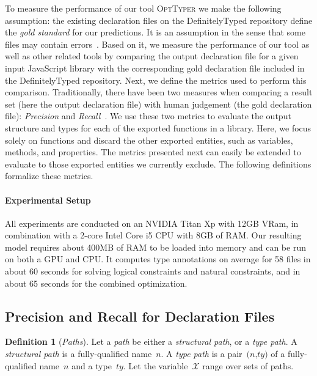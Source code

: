 \documentclass[sigplan,10pt,review,anonymous]{acmart} %
\newcommand{\projectname}{\textsc{OptTyper}\xspace}
\theoremstyle{plain}
\theoremstyle{remark}
\theoremstyle{definition}
\newtheorem{defn}{Definition}[section]
\begin{document}
To measure the performance of our tool \projectname we make the following assumption:
the existing declaration files on the DefinitelyTyped repository define the \textit{gold standard}
for our predictions.
It is an assumption in the sense that some files may contain errors~\citep{williams17}.
Based on it, we measure the performance of our tool as well as other related tools
by comparing the output declaration file for a given input JavaScript library
with the corresponding gold declaration file included in the DefinitelyTyped repository.
Next, we define the metrics used to perform this comparison.
Traditionally, there have been two measures when comparing a result set
(here the output declaration file) with human judgement (the gold declaration file):
\textit{Precision} and \textit{Recall}~\citep{russel16}.
We use these two metrics to evaluate the output structure and types for each of the exported functions in a library.
Here, we focus solely on functions and discard the other exported entities,
such as variables, methods, and properties.
The metrics presented next can easily be extended to evaluate to those exported
entities we currently exclude.
The following definitions formalize these metrics.

\paragraph{Experimental Setup}

All experiments are conducted on an NVIDIA Titan Xp with 12GB VRam,
in combination with a 2-core Intel Core i5 CPU with 8GB of RAM.
Our resulting model requires about 400MB of RAM to be loaded into memory and can be run on both a GPU and CPU.
It computes type annotations on average for 58 files in about 60 seconds
for solving logical constraints and natural constraints, and in about 65 seconds for the combined optimization.
\subsection{Precision and Recall for Declaration Files}

\begin{defn}[\emph{Paths}]
	Let a \emph{path} be either a \emph{structural path}, or a \emph{type path}.
	A \emph{structural path} is a fully-qualified name~$\textit{n}$.
	A \emph{type path} is a pair~$\textit{(n,ty)}$ of a fully-qualified name~$\textit{n}$ and a type~$\textit{ty}$.
	Let the variable~$\mathcal{X}$ range over sets of paths.
\end{defn}
\end{document}
